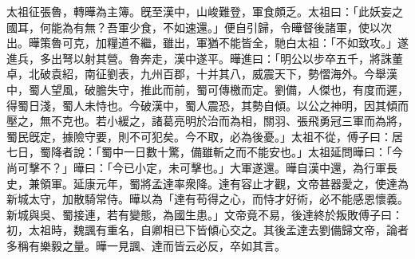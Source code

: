 \begin{pinyinscope}
太祖征張魯，轉曄為主簿。旣至漢中，山峻難登，軍食頗乏。太祖曰：「此妖妄之國耳，何能為有無？吾軍少食，不如速還。」便自引歸，令曄督後諸軍，使以次出。曄策魯可克，加糧道不繼，雖出，軍猶不能皆全，馳白太祖：「不如致攻。」遂進兵，多出弩以射其營。魯奔走，漢中遂平。曄進曰：「明公以步卒五千，將誅董卓，北破袁紹，南征劉表，九州百郡，十并其八，威震天下，勢慴海外。今舉漢中，蜀人望風，破膽失守，推此而前，蜀可傳檄而定。劉備，人傑也，有度而遲，得蜀日淺，蜀人未恃也。今破漢中，蜀人震恐，其勢自傾。以公之神明，因其傾而壓之，無不克也。若小緩之，諸葛亮明於治而為相，關羽、張飛勇冠三軍而為將，蜀民旣定，據險守要，則不可犯矣。今不取，必為後憂。」太祖不從，傅子曰：居七日，蜀降者說：「蜀中一日數十驚，備雖斬之而不能安也。」太祖延問曄曰：「今尚可擊不？」曄曰：「今已小定，未可擊也。」大軍遂還。曄自漢中還，為行軍長史，兼領軍。延康元年，蜀將孟達率衆降。達有容止才觀，文帝甚器愛之，使達為新城太守，加散騎常侍。曄以為「達有苟得之心，而恃才好術，必不能感恩懷義。新城與吳、蜀接連，若有變態，為國生患。」文帝竟不易，後達終於叛敗傅子曰：初，太祖時，魏諷有重名，自卿相已下皆傾心交之。其後孟達去劉備歸文帝，論者多稱有樂毅之量。曄一見諷、達而皆云必反，卒如其言。


\end{pinyinscope}

